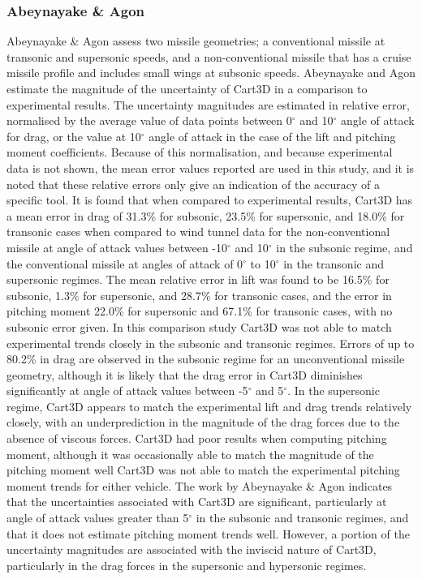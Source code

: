 \subsubsection{Abeynayake \& Agon}
Abeynayake \& Agon assess two missile geometries; a conventional missile at transonic and supersonic speeds, and a non-conventional missile that has a cruise missile profile and includes small wings at subsonic speeds\cite{Abeynayake2013a}. Abeynayake and Agon estimate the magnitude of the uncertainty of Cart3D in a comparison to experimental results. The uncertainty magnitudes are estimated in relative error, normalised by the average value of data points between 0$^\circ$ and 10$^\circ$ angle of attack for drag, or the value at 10$^\circ$ angle of attack in the case of the lift and pitching moment coefficients\cite{Abeynayake2013a}. Because of this normalisation, and because experimental data is not shown\cite{Abeynayake2013a}, the mean error values reported are used in this study, and it is noted that these relative errors only give an indication of the accuracy of a specific tool\cite{Abeynayake2013a}. It is found that when compared to experimental results, Cart3D has a mean error in drag of 31.3\% for subsonic, 23.5\% for supersonic, and 18.0\% for transonic cases\cite{Abeynayake2013a} when compared to wind tunnel data for the non-conventional missile at angle of attack values between -10$^\circ$ and 10$^\circ$ in the subsonic regime, and the conventional missile at angles of attack of 0$^\circ$ to 10$^\circ$ in the transonic and supersonic regimes. The mean relative error in lift was found to be 16.5\% for subsonic, 1.3\% for supersonic, and 28.7\% for transonic cases\cite{Abeynayake2013a}, and the error in pitching moment 22.0\% for supersonic and 67.1\% for transonic cases, with no subsonic error given\cite{Abeynayake2013a}.
In this comparison study Cart3D was not able to match experimental trends closely in the subsonic and transonic regimes. Errors of up to 80.2\% in drag are observed in the subsonic regime for an unconventional missile geometry\cite{Abeynayake2013a}, although it is likely that the drag error in Cart3D diminishes significantly at angle of attack values between -5$^\circ$ and 5$^\circ$. In the supersonic regime, Cart3D appears to match the experimental lift and drag trends relatively closely, with an underprediction in the magnitude of the drag forces due to the absence of viscous forces. 
Cart3D had poor results when computing pitching moment, although it was occasionally able to match the magnitude of the pitching moment well Cart3D was not able to match the experimental pitching moment trends for either vehicle\cite{Abeynayake2013a}. The work by Abeynayake \& Agon indicates that the uncertainties associated with Cart3D are significant, particularly at angle of attack values greater than 5$^\circ$ in the subsonic and transonic regimes, and that it does not estimate pitching moment trends well. However, a portion of the uncertainty magnitudes are associated with the inviscid nature of Cart3D, particularly in the drag forces in the supersonic and hypersonic regimes.

